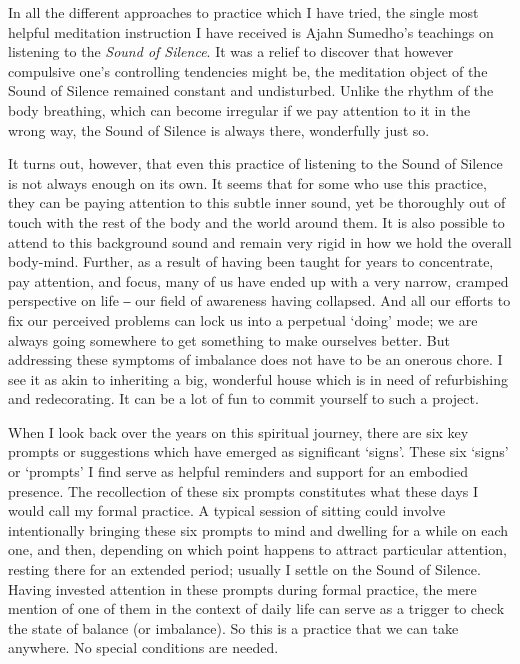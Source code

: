 In all the different approaches to practice which I have tried, the
single most helpful meditation instruction I have received is Ajahn
Sumedho's teachings on listening to the \emph{Sound of Silence}\cite{sound-of-silence}.
It was a relief to discover that however
compulsive one's controlling tendencies might be, the meditation object
of the Sound of Silence remained constant and undisturbed. Unlike the
rhythm of the body breathing, which can become irregular if we pay
attention to it in the wrong way, the Sound of Silence is always there,
wonderfully just so.

It turns out, however, that even this practice of listening to the Sound
of Silence is not always enough on its own. It seems that for some who
use this practice, they can be paying attention to this subtle inner
sound, yet be thoroughly out of touch with the rest of the body and the
world around them. It is also possible to attend to this background
sound and remain very rigid in how we hold the overall body-mind.
Further, as a result of having been taught for years to concentrate, pay
attention, and focus, many of us have ended up with a very narrow,
cramped perspective on life ‒ our field of awareness having collapsed.
And all our efforts to fix our perceived problems can lock us into a
perpetual `doing' mode; we are always going somewhere to get something
to make ourselves better. But addressing these symptoms of imbalance
does not have to be an onerous chore. I see it as akin to inheriting a
big, wonderful house which is in need of refurbishing and redecorating.
It can be a lot of fun to commit yourself to such a project.

When I look back over the years on this spiritual journey, there are six
key prompts or suggestions which have emerged as significant `signs'.
These six `signs' or `prompts' I find serve as helpful reminders and
support for an embodied presence. The recollection of these six prompts
constitutes what these days I would call my formal practice. A typical
session of sitting could involve intentionally bringing these six
prompts to mind and dwelling for a while on each one, and then,
depending on which point happens to attract particular attention,
resting there for an extended period; usually I settle on the Sound of
Silence. Having invested attention in these prompts during formal
practice, the mere mention of one of them in the context of daily life
can serve as a trigger to check the state of balance (or imbalance). So
this is a practice that we can take anywhere. No special conditions are
needed.

